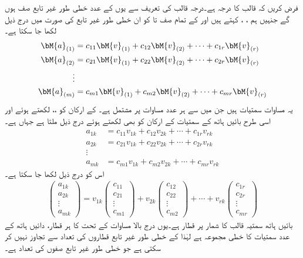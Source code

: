 فرض کریں کہ  قالب  کا درجہ  ہے۔درجہ قالب کی تعریف سے یوں  کے  عدد خطی طور غیر تابع صف ہوں گے جنہیں ہم ، ،  کہتے ہیں اور  کے تمام صف  تا  کو ان خطی طور غیر تابع کی صورت میں درج ذیل لکھا جا سکتا ہے۔
\begin{align*}
\bM{a}_{(1)}&=c_{11}\bM{v}_{(1)}+c_{12}\bM{v}_{(2)}+\cdots+c_{1r}\bM{v}_{(r)}\\
\bM{a}_{(2)}&=c_{21}\bM{v}_{(1)}+c_{22}\bM{v}_{(2)}+\cdots+c_{2r}\bM{v}_{(r)}\\
\vdots\\
\bM{a}_{(m)}&=c_{m1}\bM{v}_{(1)}+c_{m2}\bM{v}_{(2)}+\cdots+c_{mr}\bM{v}_{(r)}
\end{align*}
یہ مساوات سمتیات ہیں جن میں سے ہر  عدد مساوات پر مشتمل ہے۔ کے ارکان کو ،، لکھتے ہوئے اور اسی طرح بائیں ہاتھ کے سمتیات کے ارکان کو بھی لکھتے ہوئے درج ذیل ملتا ہے جہاں  ہے۔
\begin{align*}
a_{1k}&=c_{11}v_{1k}+c_{12}v_{2k}+\cdots+c_{1r}v_{rk}\\
a_{2k}&=c_{21}v_{1k}+c_{22}v_{2k}+\cdots+c_{2r}v_{rk}\\
\vdots\\
a_{mk}&=c_{m1}v_{1k}+c_{m2}v_{2k}+\cdots+c_{mr}v_{rk}
\end{align*} 
اس کو درج ذیل لکھا جا سکتا ہے۔
\begin{align*}
\begin{pmatrix}a_{1k}\\a_{2k}\\ \vdots\\ a_{mk}\end{pmatrix}=
v_{1k}\begin{pmatrix}c_{11}\\ c_{21} \\ \vdots\\ c_{m1}   \end{pmatrix}+v_{2k}\begin{pmatrix}c_{12}\\ c_{22} \\ \vdots\\ c_{m2}   \end{pmatrix}+\cdots+v_{rk}\begin{pmatrix}c_{1r}\\ c_{2r} \\ \vdots\\ c_{mr}   \end{pmatrix}
\end{align*}
بائیں ہاتھ سمتیہ  قالب کا  شمار پر قطار ہے۔یوں درج بالا مساوات کے تحت  کا ہر قطار، دائیں ہاتھ کے  عدد سمتیات کا خطی مجموعہ ہے لہٰذا  کے خطی طور غیر تابع قطاروں کی تعداد  سے تجاوز نہیں کر سکتی ہے جو خطی طور غیر تابع صفوں کی تعداد ہے۔

